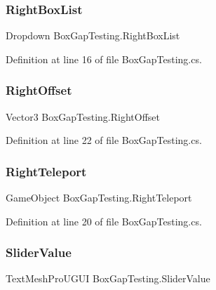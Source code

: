 \subsubsection{\texorpdfstring{Right\+Box\+List}{RightBoxList}}
{\footnotesize\ttfamily Dropdown Box\+Gap\+Testing.\+Right\+Box\+List}



Definition at line 16 of file Box\+Gap\+Testing.\+cs.

\mbox{\label{class_box_gap_testing_afbee8e29e47502e031a7068574f4bd31}} 
\subsubsection{\texorpdfstring{Right\+Offset}{RightOffset}}
{\footnotesize\ttfamily Vector3 Box\+Gap\+Testing.\+Right\+Offset}



Definition at line 22 of file Box\+Gap\+Testing.\+cs.

\mbox{\label{class_box_gap_testing_a9a97a6a39b3a430006c2e95c545a9c9c}} 
\subsubsection{\texorpdfstring{Right\+Teleport}{RightTeleport}}
{\footnotesize\ttfamily Game\+Object Box\+Gap\+Testing.\+Right\+Teleport}



Definition at line 20 of file Box\+Gap\+Testing.\+cs.

\mbox{\label{class_box_gap_testing_a95f91ad63ea1f94627d347064bd40016}} 
\subsubsection{\texorpdfstring{Slider\+Value}{SliderValue}}
{\footnotesize\ttfamily Text\+Mesh\+Pro\+U\+G\+UI Box\+Gap\+Testing.\+Slider\+Value}



